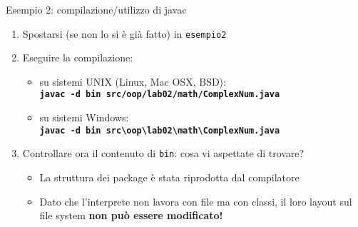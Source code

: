 \documentclass[presentation]{beamer}
\begin{document}

\begin{frame}{Esempio 2: compilazione/utilizzo di javac}
	\begin{enumerate}
		\item Spostarsi (se non lo si è già fatto) in \texttt{esempio2}
		\item Eseguire la compilazione:
		\begin{itemize}
			\item su sistemi UNIX (Linux, Mac OSX, BSD):\\ \textbf{\texttt{javac -d bin src/oop/lab02/math/ComplexNum.java}}
			\item su sistemi Windows:\\ \textbf{\texttt{javac -d bin src\textbackslash{}oop\textbackslash{}lab02\textbackslash{}math\textbackslash{}ComplexNum.java}}
		\end{itemize}
		\item Controllare ora il contenuto di \texttt{bin}: cosa vi aspettate di trovare?
		\begin{itemize}
			\item La struttura dei package è stata riprodotta dal compilatore
			\item Dato che l'interprete non lavora con file ma con \alert{classi}, il loro layout sul file system \textbf{non può essere modificato!}
		\end{itemize}
	\end{enumerate}
\end{frame}


\end{document}
